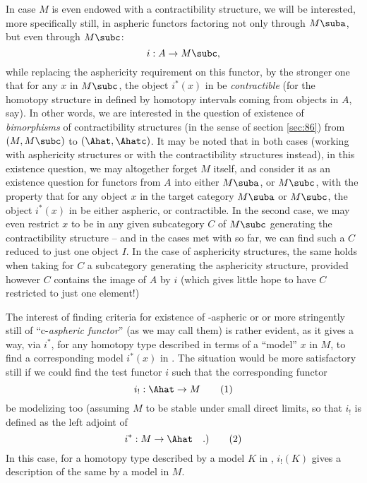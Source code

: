 In case $M$ is even endowed with a contractibility structure, we will
be interested, more specifically still, in aspheric functors factoring
not only through $M\suba$, but even through $M\subc$:
\[ i:A\to M\subc,\]
while replacing the asphericity requirement on this functor, by the
stronger one that for any $x$ in $M\subc$, the object $i^*(x)$ in
\Ahat{} be \emph{contractible} (for the homotopy structure in \Ahat{}
defined by homotopy intervals coming from objects in $A$, say). In
other words, we are interested in the question of existence of
\emph{bimorphisms} of contractibility structures (in the sense of
section \ref{sec:86}) from $(M,M\subc)$ to $(\Ahat,\Ahatc)$. It may be
noted that in both cases (working with asphericity structures or with
the contractibility structures instead), in this existence question,
we may altogether forget $M$ itself, and consider it as an existence
question for functors from $A$ into either $M\suba$, or $M\subc$, with
the property that for any object $x$ in the target category $M\suba$
or $M\subc$, the object $i^*(x)$ in \Ahat{} be either aspheric, or
contractible. In the second case, we may even restrict $x$ to be in
any given subcategory $C$ of $M\subc$ generating the contractibility
structure -- and in the cases met with so far, we can find such a $C$
reduced to just one object $I$. In the case of asphericity structures,
the same holds when taking for $C$ a subcategory generating the
asphericity structure, provided however $C$ contains the image of $A$
by $i$ (which gives little hope to have $C$ restricted to just one
element!)

The interest of finding criteria for existence of \scrW-aspheric
or or more stringently still of ``c-\emph{aspheric
  functor}'' (as we may call them) is rather evident, as it gives a
way, via $i^*$, for any homotopy type described in terms of a
``model'' $x$ in $M$, to find a corresponding model $i^*(x)$ in
\Ahat. The situation would be more satisfactory still if we could find
the test functor $i$ such that the corresponding functor
\begin{equation}
  \label{eq:90.1}
  i_!:\Ahat\to M\tag{1}
\end{equation}
be modelizing too (assuming $M$ to be stable under small direct
limits, so that $i_!$ is defined as the left adjoint of
\begin{equation}
  \label{eq:90.2}
  i^*:M\to\Ahat\quad\text{.)}\tag{2}
\end{equation}
In this case, for a homotopy type described by a model $K$ in \Ahat,
$i_!(K)$ gives a description of the same by a model in $M$.

